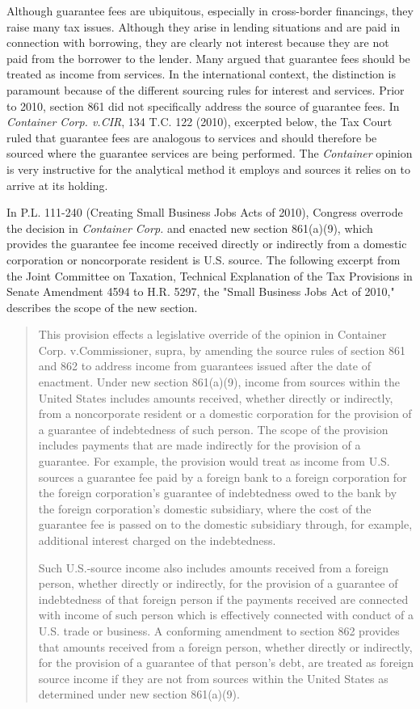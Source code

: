 Although guarantee fees are ubiquitous, especially in cross-border financings, they raise many tax issues.  Although they arise in lending situations and are paid in connection with borrowing, they are clearly not interest because they are not paid from the borrower to the lender.  Many argued that guarantee fees should be treated as income from services.  In the international context, the distinction is paramount because of the different sourcing rules for interest and services.  Prior to 2010, section 861 did not specifically address the source of guarantee fees.  In \emph{Container Corp. v.\@ CIR}, 134 T.C. 122 (2010), excerpted below, the Tax Court ruled that guarantee fees are analogous to services and should therefore be sourced where the guarantee services are being performed.  The \emph{Container} opinion is very instructive for the analytical method it employs and sources it relies on to arrive at its holding.   


In P.L. 111-240 (Creating Small Business Jobs Acts of 2010), Congress overrode the decision in \emph{Container Corp.} and enacted new section 861(a)(9), which provides the guarantee fee income received directly or indirectly from a domestic corporation or noncorporate resident is U.S. source.  The following excerpt from the Joint Committee on Taxation, Technical Explanation of the Tax Provisions in Senate Amendment 4594 to H.R. 5297, the "Small Business Jobs Act of 2010," describes the scope of the new section.
	\begin{quote}
This provision effects a legislative override of the opinion in Container Corp. v.\@ Commissioner, supra, by 
amending the source rules of section 861 and 862 to address income from guarantees issued after the date 
of enactment. Under new section 861(a)(9), income from sources within the United States includes amounts 
received, whether directly or indirectly, from a noncorporate resident or a domestic corporation for the 
provision of a guarantee of indebtedness of such person. The scope of the provision includes payments that 
are made indirectly for the provision of a guarantee. For example, the provision would treat as income from 
U.S. sources a guarantee fee paid by a foreign bank to a foreign corporation for the foreign corporation's 
guarantee of indebtedness owed to the bank by the foreign corporation's domestic subsidiary, where the 
cost of the guarantee fee is passed on to the domestic subsidiary through, for example, additional interest 
charged on the indebtedness. 

Such U.S.-source income also includes amounts received from a foreign person, whether directly or 
indirectly, for the provision of a guarantee of indebtedness of that foreign person if the payments received 
are connected with income of such person which is effectively connected with conduct of a U.S. trade or 
business. A conforming amendment to section 862 provides that amounts received from a foreign person, 
whether directly or indirectly, for the provision of a guarantee of that person's debt, are treated as foreign 
source income if they are not from sources within the United States as determined under new section 861(a)(9). 

	\end{quote}


